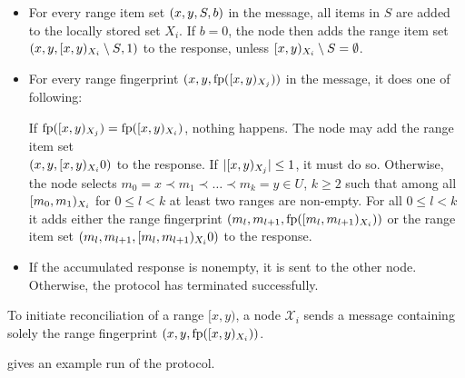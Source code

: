 \begin{itemize}
  \item For every range item set $({x}, {y}, {S}, {b})$ in the message, all items in $S$ are added to the locally stored set $X_i$. If $b = 0$, the node then adds the range item set $({x}, {y}, {[{x},{y})_{X_i} \setminus S}, {1})$ to the response, unless $[{x},{y})_{X_i} \setminus S = \emptyset$.
  \item For every range fingerprint $({x}, {y}, {\operatorname{fp}([{x},{y})_{X_j})})$ in the message, it does one of following:
    \begin{caselist}
       \label{def-fingerprint-eq} If $\operatorname{fp}([{x},{y})_{X_j}) = \operatorname{fp}([{x},{y})_{X_i})$, nothing happens.
       \label{def-recursion-anchor} The node may add the range item set\\
$({x}, {y}, [{x},{y})_{X_i}{0})$ to the response. If $|{[{x},{y})_{X_j}}| \leq 1$, it must do so.
      \case[Recurse] \label{def-recurse} Otherwise, the node selects $m_0 = x \prec m_1 \prec \ldots \prec m_k = y \in U$, $k \geq 2$ such that among all $[{m_0},{m_1})_{X_i}$ for  $0 \leq l < k$ at least two ranges are non-empty. For all $0 \leq l < k$ it adds either the range fingerprint $({m_l}, {m_{l + 1}}, {\operatorname{fp}([{m_l},{m_{l + 1}})_{X_i})})$ or the range item set $({m_l}, {m_{l + 1}}, [{m_l},{m_{l + 1}})_{X_i}{0})$ to the response.
    \end{caselist}
  \item If the accumulated response is nonempty, it is sent to the other node. Otherwise, the protocol has terminated successfully.
\end{itemize}

To initiate reconciliation of a range $[x, y)$, a node $\mathcal{X}_i$ sends a message containing solely the range fingerprint $({x}, {y}, {\operatorname{fp}([{x},{y})_{X_i})})$.

 gives an example run of the protocol.

